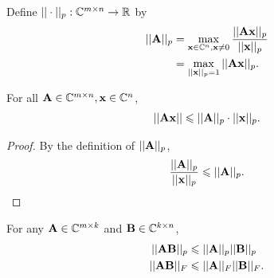 \begin{definition}{}{}
    Define $||\cdot||_p:\mathbb{C}^{m\times n}\rightarrow \mathbb{R}$ by
    \begin{align*}
        ||\bold{A}||_{p}&=\max_{\bold{x}\in\mathbb{C}^n,\bold{x}\neq 0}\frac{||\bold{A\bold{x}}||_{p}}{||\bold{x}||_p}\\
                            &=\max_{||\bold{x}||_p=1}||\bold{A}\bold{x}||_{p}.
    \end{align*}
\end{definition}

\begin{proposition}{}{}
    For all $\bold{A}\in \mathbb{C}^{m\times n}, \bold{x}\in \mathbb{C}^n$,
    \begin{align*}
        ||\bold{A}\bold{x}||\leqslant ||\bold{A}||_p\cdot ||\bold{x}||_p.
    \end{align*}
\end{proposition}
\begin{proof}
    By the definition of $||\bold{A}||_p$,
    \begin{align*}
        \frac{||\bold{A}||_p}{||\bold{x}||_p}\leqslant ||\bold{A}||_p.
    \end{align*}
\end{proof}


\begin{proposition}{}{}
    For any $\bold{A}\in \mathbb{C}^{m\times k}$ and $\bold{B}\in\mathbb{C}^{k\times n}$, 
    \begin{align*}
        ||\bold{A}\bold{B}||_p&\leqslant ||\bold{A}||_p||\bold{B}||_p\\
        ||\bold{A}\bold{B}||_F&\leqslant ||\bold{A}||_F||\bold{B}||_F.
    \end{align*}
\end{proposition}

